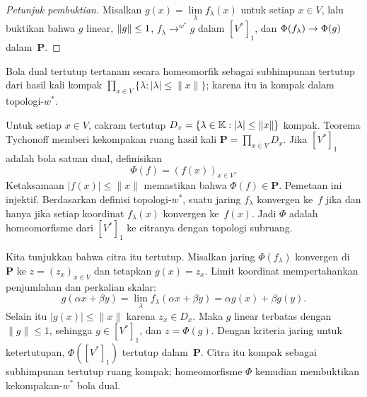 \begin{o001readerwork}
\begin{o001sourcehint}
\begin{proof}[\emph{Petunjuk pembuktian}]
Misalkan $g(x) = \lim\limits_\lambda f_\lambda(x)$ untuk setiap $x \in V$, lalu buktikan bahwa $g$ linear, $\lVert g\rVert \le 1$,
$f_\lambda \to^{w^*} g$ dalam $[V^*]_1$, dan $\Phi(f_\lambda) \rightarrow \Phi(g)$ dalam~$\mathbf P$.  \ns
\end{proof}
\end{o001sourcehint}
\begin{o001answer}
Bola dual tertutup tertanam secara homeomorfik sebagai subhimpunan tertutup
dari hasil kali kompak $\prod_{x\in V}\{\lambda:|\lambda|\leq\|x\|\}$;
karena itu ia kompak dalam topologi-$w^*$.
\end{o001answer}
\begin{o001proof}
Untuk setiap $x\in V$, cakram tertutup
$D_x=\{\lambda\in\mathbb{K}:|\lambda|\leq\|x\|\}$ kompak. Teorema Tychonoff memberi
kekompakan ruang hasil kali $\mathbf P=\prod_{x\in V}D_x$. Jika
$[V^*]_1$ adalah bola satuan dual, definisikan
\[
 \Phi(f)=(f(x))_{x\in V}.
\]
Ketaksamaan $|f(x)|\leq\|x\|$ memastikan bahwa $\Phi(f)\in\mathbf P$.
Pemetaan ini injektif. Berdasarkan definisi topologi-$w^*$, suatu jaring
$f_\lambda$ konvergen ke~$f$ jika dan hanya jika setiap koordinat
$f_\lambda(x)$ konvergen ke~$f(x)$. Jadi $\Phi$ adalah homeomorfisme dari
$[V^*]_1$ ke citranya dengan topologi subruang.

Kita tunjukkan bahwa citra itu tertutup. Misalkan jaring
$\Phi(f_\lambda)$ konvergen di~$\mathbf P$ ke $z=(z_x)_{x\in V}$ dan tetapkan
$g(x)=z_x$. Limit koordinat mempertahankan penjumlahan dan perkalian skalar:
\[
 g(\alpha x+\beta y)
 =\lim_\lambda f_\lambda(\alpha x+\beta y)
 =\alpha g(x)+\beta g(y).
\]
Selain itu $|g(x)|\leq\|x\|$ karena $z_x\in D_x$. Maka $g$ linear terbatas
dengan $\|g\|\leq1$, sehingga $g\in[V^*]_1$, dan $z=\Phi(g)$. Dengan
kriteria jaring untuk ketertutupan, $\Phi([V^*]_1)$ tertutup dalam~$\mathbf P$.
Citra itu kompak sebagai subhimpunan tertutup ruang kompak; homeomorfisme
$\Phi$ kemudian membuktikan kekompakan-$w^*$ bola dual.
\end{o001proof}
\end{o001readerwork}


